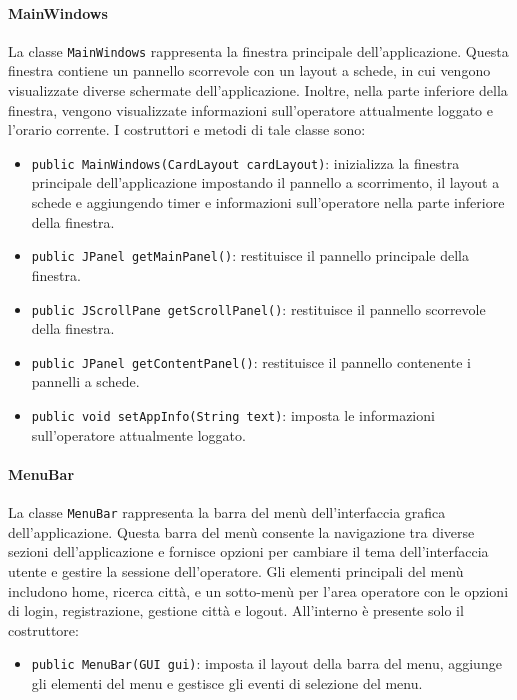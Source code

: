 \paragraph{MainWindows}
La classe \texttt{MainWindows} rappresenta la finestra principale dell'applicazione.
Questa finestra contiene un pannello scorrevole con un layout a schede, in cui vengono visualizzate diverse schermate dell'applicazione. 
Inoltre, nella parte inferiore della finestra, vengono visualizzate informazioni sull'operatore attualmente loggato e l'orario corrente.
I costruttori e metodi di tale classe sono:
\begin{itemize}
    \item \texttt{public MainWindows(CardLayout cardLayout)}: inizializza la finestra principale dell'applicazione impostando il pannello a scorrimento, il layout a schede e aggiungendo timer e informazioni sull'operatore nella parte inferiore della finestra.
    \item \texttt{public JPanel getMainPanel()}: restituisce il pannello principale della finestra.
    \item \texttt{public JScrollPane getScrollPanel()}: restituisce il pannello scorrevole della finestra.
    \item \texttt{public JPanel getContentPanel()}: restituisce il pannello contenente i pannelli a schede.
    \item \texttt{public void setAppInfo(String text)}: imposta le informazioni sull'operatore attualmente loggato.
\end{itemize}

\paragraph{MenuBar}

La classe \texttt{MenuBar} rappresenta la barra del menù dell'interfaccia grafica dell'applicazione.
Questa barra del menù consente la navigazione tra diverse sezioni dell'applicazione e fornisce opzioni per cambiare il tema dell'interfaccia utente e gestire la sessione dell'operatore.
Gli elementi principali del menù includono home, ricerca città, e un sotto-menù per l'area operatore con le opzioni di login, registrazione, gestione città e logout.
All'interno è presente solo il costruttore:
\begin{itemize}
    \item \texttt{public MenuBar(GUI gui)}: imposta il layout della barra del menu, aggiunge gli elementi del menu e gestisce gli eventi di selezione del menu.
\end{itemize}


